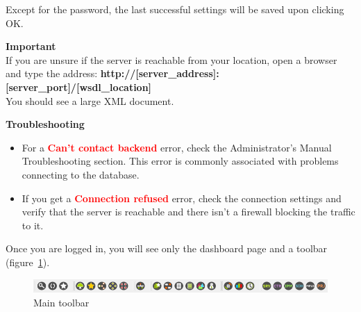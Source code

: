 \documentclass[a4paper]{article}
\begin{document}
	Except for the password, the last successful settings will be saved upon clicking OK.
	\begin{framed} {\large \textbf{Important}} \\
		If you are unsure if the server is reachable from your location, open a browser and type the address: \textbf{http://[server\_address]:[server\_port]/[wsdl\_location]}\\
		
		You should see a large XML document.
	\end{framed}
	\begin{framed} {\large \textbf{Troubleshooting}}
		\begin{itemize}
			\item For a \textbf{\textcolor{red}{Can't contact backend}} error, check the Administrator's Manual Troubleshooting section. This error is commonly associated with problems connecting to the database.
			\item If you get a \textbf{\textcolor{red}{Connection refused}} error, check the connection settings and verify that the server is reachable and there isn't a firewall blocking the traffic to it.
		\end{itemize}
	\end{framed} 
	Once you are logged in, you will see only the dashboard page and a toolbar (figure~\ref{fig:main_toolbar}).\\
	\begin{figure}[h!]
		\centering
		\includegraphics[width=0.8\linewidth]{img/main_toolbar.png}
		\caption{Main toolbar}
		\label{fig:main_toolbar}
	\end{figure}
	
\end{document}

